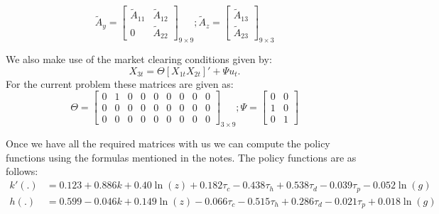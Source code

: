 \documentclass[12pt]{article}
\begin{document}
\begin{equation*}
\tilde{A}_y = \begin{bmatrix} \tilde{A}_{11} & \tilde{A}_{12} \\ 0 & \tilde{A}_{22} \end{bmatrix}_{9 \times 9}; \tilde{A}_z = \begin{bmatrix} \tilde{A}_{13} \\ \tilde{A}_{23} \end{bmatrix}_{9 \times 3} 
\end{equation*}

We also make use of the market clearing conditions given by: $$X_{3t} = \Theta [X_{1t} X_{2t}]' + \Psi u_t.$$ For the current problem these matrices are given as:
 \begin{equation*}
\Theta = \begin{bmatrix} 0 & 1 & 0 & 0 & 0 & 0 & 0 & 0 & 0\\ 0 & 0 & 0 & 0 & 0 & 0 & 0 & 0 & 0\\ 0 & 0 & 0 & 0 & 0 & 0 &0 &0 & 0\end{bmatrix}_{3 \times 9}; \Psi = \begin{bmatrix} 0 & 0 \\ 1 & 0 \\ 0 & 1\end{bmatrix}
\end{equation*}

Once we have all the required matrices with us we can compute the policy functions using the formulas mentioned in the notes.
The policy functions are as follows: 
\begin{align*}
k'(.) &  =  0.123  +0.886k   +0.40\ln(z)  +0.182\tau_c  -0.438\tau_h   +0.538\tau_d    -0.039\tau_p   - 0.052 \ln(g)\\
h(.) & = 0.599   -0.046k  +0.149\ln(z)  -0.066\tau_c  -0.515\tau_h  +0.286\tau_d  -0.021\tau_p  +0.018\ln(g)
\end{align*}
\end{document}

